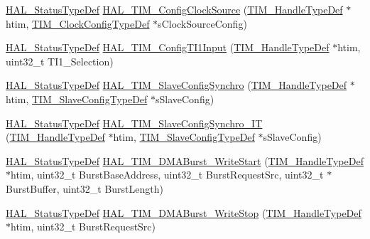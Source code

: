 \begin{DoxyCompactItemize}
\item 
\hyperlink{stm32f4xx__hal__def_8h_a63c0679d1cb8b8c684fbb0632743478f}{H\+A\+L\+\_\+\+Status\+Type\+Def} \hyperlink{group___t_i_m___exported___functions___group8_ga43403d13849f71285ea1da3f3cb1381f}{H\+A\+L\+\_\+\+T\+I\+M\+\_\+\+Config\+Clock\+Source} (\hyperlink{struct_t_i_m___handle_type_def}{T\+I\+M\+\_\+\+Handle\+Type\+Def} $\ast$htim, \hyperlink{struct_t_i_m___clock_config_type_def}{T\+I\+M\+\_\+\+Clock\+Config\+Type\+Def} $\ast$s\+Clock\+Source\+Config)
\item 
\hyperlink{stm32f4xx__hal__def_8h_a63c0679d1cb8b8c684fbb0632743478f}{H\+A\+L\+\_\+\+Status\+Type\+Def} \hyperlink{group___t_i_m___exported___functions___group8_ga7dfab2adafd2f2e315a9531f1150c201}{H\+A\+L\+\_\+\+T\+I\+M\+\_\+\+Config\+T\+I1\+Input} (\hyperlink{struct_t_i_m___handle_type_def}{T\+I\+M\+\_\+\+Handle\+Type\+Def} $\ast$htim, uint32\+\_\+t T\+I1\+\_\+\+Selection)
\item 
\hyperlink{stm32f4xx__hal__def_8h_a63c0679d1cb8b8c684fbb0632743478f}{H\+A\+L\+\_\+\+Status\+Type\+Def} \hyperlink{group___t_i_m___exported___functions___group8_ga807bb9a9888b0939f6060b06c624df1b}{H\+A\+L\+\_\+\+T\+I\+M\+\_\+\+Slave\+Config\+Synchro} (\hyperlink{struct_t_i_m___handle_type_def}{T\+I\+M\+\_\+\+Handle\+Type\+Def} $\ast$htim, \hyperlink{struct_t_i_m___slave_config_type_def}{T\+I\+M\+\_\+\+Slave\+Config\+Type\+Def} $\ast$s\+Slave\+Config)
\item 
\hyperlink{stm32f4xx__hal__def_8h_a63c0679d1cb8b8c684fbb0632743478f}{H\+A\+L\+\_\+\+Status\+Type\+Def} \hyperlink{group___t_i_m___exported___functions___group8_gaceeb45044aea466d267537e7f35d9e3d}{H\+A\+L\+\_\+\+T\+I\+M\+\_\+\+Slave\+Config\+Synchro\+\_\+\+IT} (\hyperlink{struct_t_i_m___handle_type_def}{T\+I\+M\+\_\+\+Handle\+Type\+Def} $\ast$htim, \hyperlink{struct_t_i_m___slave_config_type_def}{T\+I\+M\+\_\+\+Slave\+Config\+Type\+Def} $\ast$s\+Slave\+Config)
\item 
\hyperlink{stm32f4xx__hal__def_8h_a63c0679d1cb8b8c684fbb0632743478f}{H\+A\+L\+\_\+\+Status\+Type\+Def} \hyperlink{group___t_i_m___exported___functions___group8_ga8d1a48bb07dcf9030de10b9c6918087c}{H\+A\+L\+\_\+\+T\+I\+M\+\_\+\+D\+M\+A\+Burst\+\_\+\+Write\+Start} (\hyperlink{struct_t_i_m___handle_type_def}{T\+I\+M\+\_\+\+Handle\+Type\+Def} $\ast$htim, uint32\+\_\+t Burst\+Base\+Address, uint32\+\_\+t Burst\+Request\+Src, uint32\+\_\+t $\ast$Burst\+Buffer, uint32\+\_\+t Burst\+Length)
\item 
\hyperlink{stm32f4xx__hal__def_8h_a63c0679d1cb8b8c684fbb0632743478f}{H\+A\+L\+\_\+\+Status\+Type\+Def} \hyperlink{group___t_i_m___exported___functions___group8_ga8f5649baaf219f2559bbe9e8e2c3658e}{H\+A\+L\+\_\+\+T\+I\+M\+\_\+\+D\+M\+A\+Burst\+\_\+\+Write\+Stop} (\hyperlink{struct_t_i_m___handle_type_def}{T\+I\+M\+\_\+\+Handle\+Type\+Def} $\ast$htim, uint32\+\_\+t Burst\+Request\+Src)

\end{DoxyCompactItemize}

